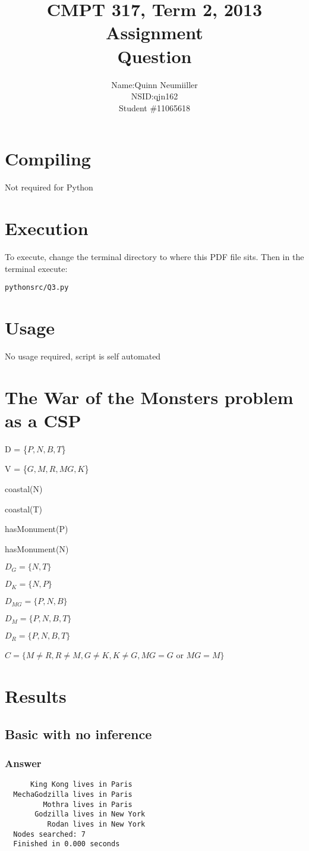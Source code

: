 \documentclass{article}
\title{CMPT 317, Term 2, 2013\\
Assignment \AssignmentNum\\
Question \QuestionNum\\
\AssignmentTitle
}
\author{
    \begin{tabular}{ l r }
      Name: & Quinn Neumiiller \\
      NSID: & qjn162 \\
      Student \# & 11065618 \\
    \end{tabular}
}
\date{\AssignmentDate}
\newcommand{\QuestionNum}{3}
\begin{document}
   \maketitle
   
   \section{Compiling}
   Not required for Python

   \section{Execution}
   To execute, change the terminal directory to where this PDF file sits.
   Then in the terminal execute:
    \begin{alltt}
    python src/Q\QuestionNum.py
    \end{alltt}

  \section{Usage}
    No usage required, script is self automated
  \section{The War of the Monsters problem as a CSP}
  {\setlength{\parindent}{0cm}
    D = \{$P, N, B, T$\}

    V = \{$G, M, R, MG, K$\}

    coastal(N)

    coastal(T)

    hasMonument(P)

    hasMonument(N)

    $D_G = \{N, T\}$

    $D_K = \{N, P\}$

    $D_{MG} = \{P, N, B\}$

    $D_M = \{P, N, B, T\}$

    $D_R = \{P, N, B, T\}$


    $C=\{M\ne R, R\ne M, G \ne K, K \ne G, MG=G$ or $MG=M\}$

  }

  \section{Results}
  \subsection{Basic with no inference}
  \subsubsection{Answer}
  \begin{verbatim}
      King Kong lives in Paris
  MechaGodzilla lives in Paris
         Mothra lives in Paris
       Godzilla lives in New York
          Rodan lives in New York
  Nodes searched: 7
  Finished in 0.000 seconds
  \end{verbatim}
\end{document}
